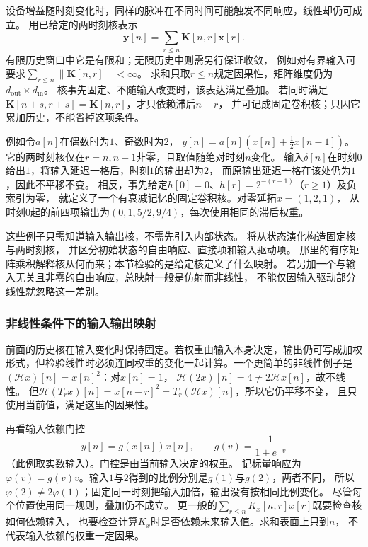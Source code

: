 设备增益随时刻变化时，同样的脉冲在不同时间可能触发不同响应，线性却仍可成立。
用已给定的两时刻核表示
\begin{equation}
  \bm y[n]=\sum_{r\leq n}\bm K[n,r]\bm x[r].
  \label{eq:signal-given-time-varying-kernel}
\end{equation}
有限历史窗口中它是有限和；无限历史中则需另行保证收敛，
例如对有界输入可要求$\sum_{r\leq n}\|\bm K[n,r]\|<\infty$。
求和只取$r\leq n$规定因果性，矩阵维度仍为
$d_{\mathrm{out}}\times d_{\mathrm{in}}$。
核事先固定、不随输入改变时，该表达满足叠加。
若同时满足$\bm K[n+s,r+s]=\bm K[n,r]$，才只依赖滞后$n-r$，
并可记成固定卷积核；只因它累加历史，不能省掉这项条件。

例如令$a[n]$在偶数时为$1$、奇数时为$2$，
$y[n]=a[n](x[n]+\tfrac12x[n-1])$。
它的两时刻核仅在$r=n,n-1$非零，且取值随绝对时刻$n$变化。
输入$\delta[n]$在时刻$0$给出$1$，将输入延迟一格后，时刻$1$的输出却为$2$，
而原输出延迟一格在该处仍为$1$，因此不平移不变。
相反，事先给定$h[0]=0$、$h[r]=2^{-(r-1)}$（$r\geq1$）及负索引为零，
就定义了一个有衰减记忆的固定卷积核。对零延拓$x=(1,2,1)$，
从时刻$0$起的前四项输出为$(0,1,5/2,9/4)$，每次使用相同的滞后权重。

这些例子只需知道输入输出核，不需先引入内部状态。
将从状态演化构造固定核与两时刻核，
并区分初始状态的自由响应、直接项和输入驱动项。
那里的有序矩阵乘积解释核从何而来；本节检验的是给定核定义了什么映射。
若另加一个与输入无关且非零的自由响应，总映射一般是仿射而非线性，
不能仅因输入驱动部分线性就忽略这一差别。

\subsubsection{非线性条件下的输入输出映射}

前面的历史核在输入变化时保持固定。若权重由输入本身决定，输出仍可写成加权
形式，但检验线性时必须连同权重的变化一起计算。一个更简单的非线性例子是$(\mathcal Hx)[n]=x[n]^2$：对$x[n]=1$，
$\mathcal H(2x)[n]=4\neq2\mathcal Hx[n]$，故不线性。
但$\mathcal H(T_rx)[n]=x[n-r]^2=T_r(\mathcal Hx)[n]$，所以它仍平移不变，
且只使用当前值，满足这里的因果性。

再看输入依赖门控
\[
  y[n]=g(x[n])x[n],\qquad g(v)=\frac1{1+e^{-v}}
\]
（此例取实数输入）。门控是由当前输入决定的权重。
记标量响应为$\varphi(v)=g(v)v$。输入$1$与$2$得到的比例分别是$g(1)$与$g(2)$，两者不同，
所以$\varphi(2)\neq2\varphi(1)$；固定同一时刻把输入加倍，输出没有按相同比例变化。
尽管每个位置使用同一规则，叠加仍不成立。
更一般的$\sum_{r\leq n}K_x[n,r]x[r]$既要检查核如何依赖输入，
也要检查计算$K_x$时是否依赖未来输入值。求和表面上只到$n$，
不代表输入依赖的权重一定因果。

